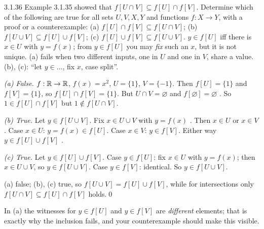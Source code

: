 \begin{bookex}[essential]{3.1.36}
Example 3.1.35 showed that $f[U\cap V]\subseteq f[U]\cap f[V]$. Determine which of the following are true for all sets $U,V,X,Y$ and functions $f:X\to Y$, with a proof or a counterexample: (a) $f[U]\cap f[V]\subseteq f[U\cap V]$; (b) $f[U\cup V]\subseteq f[U]\cup f[V]$; (c) $f[U]\cup f[V]\subseteq f[U\cup V]$.
\solution
\given $y\in f[U]$ iff there is $x\in U$ with $y=f(x)$; from $y\in f[U]$ you may \emph{fix} such an $x$, but it is not unique.
\plan (a) fails when two different inputs, one in $U$ and one in $V$, share a value. (b), (c): ``let $y\in\dots$, fix $x$, case split''.
\begin{steps}
\item \emph{(a) False.} $f:\mathbb{R}\to\mathbb{R}$, $f(x)=x^2$, $U=\{1\}$, $V=\{-1\}$. Then $f[U]=\{1\}$ and $f[V]=\{1\}$, so $f[U]\cap f[V]=\{1\}$. But $U\cap V=\varnothing$ and $f[\varnothing]=\varnothing$ . So $1\in f[U]\cap f[V]$ but $1\notin f[U\cap V]$.
\item \emph{(b) True.} Let $y\in f[U\cup V]$. Fix $x\in U\cup V$ with $y=f(x)$ . Then $x\in U$ or $x\in V$. Case $x\in U$: $y=f(x)\in f[U]$. Case $x\in V$: $y\in f[V]$. Either way $y\in f[U]\cup f[V]$ .
\item \emph{(c) True.} Let $y\in f[U]\cup f[V]$. Case $y\in f[U]$: fix $x\in U$ with $y=f(x)$; then $x\in U\cup V$, so $y\in f[U\cup V]$. Case $y\in f[V]$: identical. So $y\in f[U\cup V]$.
\end{steps}
\conclusion (a) false; (b), (c) true, so $f[U\cup V]=f[U]\cup f[V]$, while for intersections only $f[U\cap V]\subseteq f[U]\cap f[V]$ holds.\qed
\begin{compare}
\item In (a) the witnesses for $y\in f[U]$ and $y\in f[V]$ are \emph{different} elements; that is exactly why the inclusion fails, and your counterexample should make this visible.
\end{compare}
\end{bookex}

